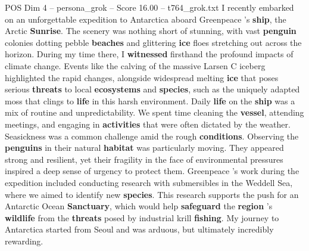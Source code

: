 \begin{textsample}{POS Dim 4 – persona\_grok – Score 16.00 – t764\_grok.txt}  \label{ex:f4_pos_035}
I recently embarked on an unforgettable expedition to Antarctica aboard Greenpeace 's \textbf{ship}, the Arctic \textbf{Sunrise}.
The scenery was nothing short of stunning, with vast \textbf{penguin} colonies dotting pebble \textbf{beaches} and glittering \textbf{ice} floes stretching out across the horizon.
During my time there, I \textbf{witnessed} firsthand the profound impacts of climate change.
Events like the calving of the massive Larsen C iceberg highlighted the rapid changes, alongside widespread melting \textbf{ice} that poses serious \textbf{threats} to local \textbf{ecosystems} and \textbf{species}, such as the uniquely adapted moss that clings to \textbf{life} in this harsh environment.
Daily \textbf{life} on the \textbf{ship} was a mix of routine and unpredictability.
We spent time cleaning the \textbf{vessel}, attending meetings, and engaging in \textbf{activities} that were often dictated by the weather.
Seasickness was a common challenge amid the rough \textbf{conditions}.
Observing the \textbf{penguins} in their natural \textbf{habitat} was particularly moving.
They appeared strong and resilient, yet their fragility in the face of environmental pressures inspired a deep sense of urgency to protect them.
Greenpeace 's work during the expedition included conducting research with submersibles in the Weddell Sea, where we aimed to identify new \textbf{species}.
This research supports the push for an Antarctic Ocean \textbf{Sanctuary}, which would help \textbf{safeguard} the \textbf{region} 's \textbf{wildlife} from the \textbf{threats} posed by industrial krill \textbf{fishing}.
My journey to Antarctica started from Seoul and was arduous, but ultimately incredibly rewarding.

\end{textsample}
